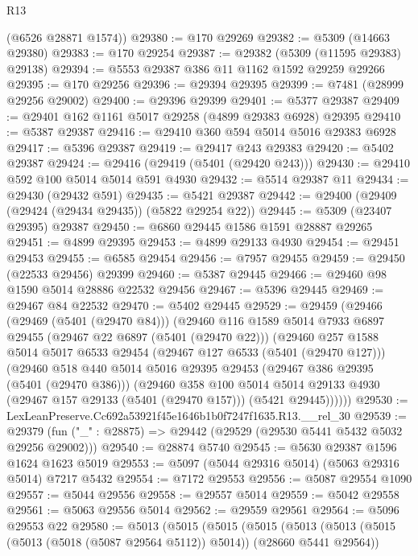\begin{lexlean}{R13}
\begin{coremodule}
      (@6526 @28871 @1574))
@29380 := @170 @29269
@29382 := @5309 (@14663 @29380)
@29383 := @170 @29254
@29387 := @29382 (@5309 (@11595 @29383) @29138)
@29394 := @5553 @29387 @386 @11 @1162 @1592 @29259 @29266
@29395 := @170 @29256
@29396 := @29394 @29395
@29399 := @7481 (@28999 @29256 @29002)
@29400 := @29396 @29399
@29401 := @5377 @29387
@29409 := @29401 @162 @1161 @5017 @29258 (@4899 @29383 @6928) @29395
@29410 := @5387 @29387
@29416 := @29410 @360 @594 @5014 @5016 @29383 @6928
@29417 := @5396 @29387
@29419 := @29417 @243 @29383
@29420 := @5402 @29387
@29424 := @29416 (@29419 (@5401 (@29420 @243)))
@29430 := @29410 @592 @100 @5014 @5014 @591 @4930
@29432 := @5514 @29387 @11
@29434 := @29430 (@29432 @591)
@29435 := @5421 @29387
@29442 := @29400 (@29409 (@29424 (@29434 @29435)) (@5822 @29254 @22))
@29445 := @5309 (@23407 @29395) @29387
@29450 := @6860 @29445 @1586 @1591 @28887 @29265
@29451 := @4899 @29395
@29453 := @4899 @29133 @4930
@29454 := @29451 @29453
@29455 := @6585 @29454
@29456 := @7957 @29455
@29459 := @29450 (@22533 @29456) @29399
@29460 := @5387 @29445
@29466 := @29460 @98 @1590 @5014 @28886 @22532 @29456
@29467 := @5396 @29445
@29469 := @29467 @84 @22532
@29470 := @5402 @29445
@29529 := @29459
    (@29466
      (@29469 (@5401 (@29470 @84)))
      (@29460
        @116
        @1589
        @5014
        @7933
        @6897
        @29455
        (@29467 @22 @6897 (@5401 (@29470 @22)))
        (@29460
          @257
          @1588
          @5014
          @5017
          @6533
          @29454
          (@29467 @127 @6533 (@5401 (@29470 @127)))
          (@29460
            @518
            @440
            @5014
            @5016
            @29395
            @29453
            (@29467 @386 @29395 (@5401 (@29470 @386)))
            (@29460
              @358
              @100
              @5014
              @5014
              @29133
              @4930
              (@29467 @157 @29133 (@5401 (@29470 @157)))
              (@5421 @29445))))))
@29530 := LexLeanPreserve.Cc692a53921f45e1646b1b0f7247f1635.R13.__rel_30
@29539 := @29379 (fun ("_" : @28875) => @29442 (@29529 (@29530 @5441 @5432 @5032 @29256 @29002)))
@29540 := @28874 @5740
@29545 := @5630 @29387 @1596 @1624 @1623 @5019
@29553 := @5097 (@5044 @29316 @5014) (@5063 @29316 @5014) @7217 @5432
@29554 := @7172 @29553
@29556 := @5087 @29554 @1090
@29557 := @5044 @29556
@29558 := @29557 @5014
@29559 := @5042 @29558
@29561 := @5063 @29556 @5014
@29562 := @29559 @29561
@29564 := @5096 @29553 @22
@29580 := @5013
    (@5015
      (@5015
        (@5015
          (@5013
            (@5013 (@5015 (@5013 (@5018 (@5087 @29564 @5112)) @5014)) (@28660 @5441 @29564))

\end{coremodule}
\end{lexlean}
